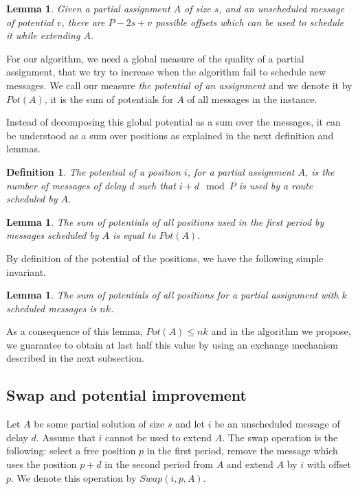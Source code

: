 \documentclass[10pt, conference, letterpaper]{IEEEtran}
\newtheorem{lemma}[theorem]{Lemma}
\newtheorem{definition}{Definition}
\begin{document}
\begin{lemma}
Given a partial assignment $A$ of size $s$, and an unscheduled message of potential 
$v$, there are $P - 2s + v$ possible offsets which can be used to schedule it while extending $A$.
\end{lemma}

For our algorithm, we need a global measure of the quality of a partial assignment, 
that we try to increase when the algorithm fail to schedule new messages. 
We call our measure \emph{the potential of an assignment} and we denote it by $Pot(A)$, it is the sum of potentials for $A$ of all messages in the instance.

Instead of decomposing this global potential as a sum over the messages, it can be understood
as a sum over positions as explained in the next definition and lemmas.
 
\begin{definition}
The potential of a position $i$, for a partial assignment $A$, is the number of messages of delay $d$ such that $i+d \mod P$ is used by a route scheduled by $A$. 
\end{definition}

\begin{lemma}\label{lemma:pot_pos}
The sum of potentials of all positions used in the first period by messages scheduled by $A$ is equal to $Pot(A)$.  
\end{lemma}

By definition of the potential of the positions, we have the following simple invariant.

\begin{lemma}\label{lemma:inv}
The sum of potentials of all positions for a partial assignment with $k$ scheduled messages is $nk$.  
\end{lemma}

 As a consequence of this lemma, $Pot(A) \leq nk$ and in the algorithm we 
 propose, we guarantee to obtain at last half this value by using an exchange mechanism described in the next subsection.

\subsection{Swap and potential improvement}


Let $A$ be some partial solution of size $s$ and let $i$ be an unscheduled message of delay $d$. 
Assume that $i$ cannot be used to extend $A$. The swap operation is the following: 
select a free position $p$ in the first period, remove the message which uses the position $p+d$ in the second period from $A$ and extend $A$ by $i$ with offset $p$. We denote this operation by $Swap(i,p,A)$.
\end{document}
